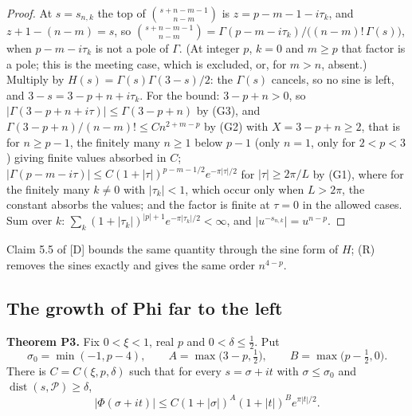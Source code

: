 \documentclass[11pt]{article}
\newcommand{\dist}{\operatorname{dist}}
\begin{document}
\begin{proof}
At $s=s_{n,k}$ the top of $\binom{s+n-m-1}{n-m}$ is $z=p-m-1-i\tau_k$, and $z+1-(n-m)=s$, so $\binom{s+n-m-1}{n-m}=\Gamma(p-m-i\tau_k)/\bigl((n-m)!\,\Gamma(s)\bigr)$, when $p-m-i\tau_k$ is not a pole of $\Gamma$. (At integer $p$, $k=0$ and $m\ge p$ that factor is a pole; this is the meeting case, which is excluded, or, for $m>n$, absent.) Multiply by $H(s)=\Gamma(s)\Gamma(3-s)/2$: the $\Gamma(s)$ cancels, so no sine is left, and $3-s=3-p+n+i\tau_k$. For the bound: $3-p+n>0$, so $|\Gamma(3-p+n+i\tau)|\le\Gamma(3-p+n)$ by (G3), and $\Gamma(3-p+n)/(n-m)!\le Cn^{2+m-p}$ by (G2) with $X=3-p+n\ge2$, that is for $n\ge p-1$, the finitely many $n\ge1$ below $p-1$ (only $n=1$, only for $2<p<3$) giving finite values absorbed in $C$; $|\Gamma(p-m-i\tau)|\le C(1+|\tau|)^{p-m-1/2}e^{-\pi|\tau|/2}$ for $|\tau|\ge2\pi/L$ by (G1), where for the finitely many $k\ne0$ with $|\tau_k|<1$, which occur only when $L>2\pi$, the constant absorbs the values; and the factor is finite at $\tau=0$ in the allowed cases. Sum over $k$: $\sum_k(1+|\tau_k|)^{|p|+1}e^{-\pi|\tau_k|/2}<\infty$, and $|u^{-s_{n,k}}|=u^{n-p}$.
\end{proof}

Claim 5.5 of [D] bounds the same quantity through the sine form of $H$; (R) removes the sines exactly and gives the same order $n^{4-p}$.

\subsection{The growth of Phi far to the left}

\noindent\textbf{Theorem P3.} Fix $0<\xi<1$, real $p$ and $0<\delta\le\frac12$. Put
\[
\sigma_0=\min(-1,p-4),\qquad A=\max\bigl(3-p,\tfrac12\bigr),\qquad B=\max\bigl(p-\tfrac12,0\bigr).
\]
There is $C=C(\xi,p,\delta)$ such that for every $s=\sigma+it$ with $\sigma\le\sigma_0$ and $\dist(s,\mathcal{P})\ge\delta$,
\[
|\Phi(\sigma+it)|\le C(1+|\sigma|)^A(1+|t|)^Be^{\pi|t|/2}.
\]
\end{document}
